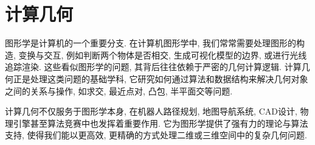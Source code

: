 \documentclass[a4paper]{ctexart}
\begin{document}


\section{计算几何}

图形学是计算机的一个重要分支. 在计算机图形学中, 我们常常需要处理图形的构造, 变换与交互, 例如判断两个物体是否相交, 生成可视化模型的边界, 或进行光线追踪渲染. 这些看似图形学的问题, 其背后往往依赖于严密的几何计算逻辑. 计算几何正是处理这类问题的基础学科, 它研究如何通过算法和数据结构来解决几何对象之间的关系与操作, 如求交, 最近点对, 凸包, 半平面交等问题.

计算几何不仅服务于图形学本身, 在机器人路径规划, 地图导航系统, CAD设计, 物理引擎甚至算法竞赛中也发挥着重要作用. 它为图形学提供了强有力的理论与算法支持, 使得我们能以更高效, 更精确的方式处理二维或三维空间中的复杂几何问题.


\end{document}
